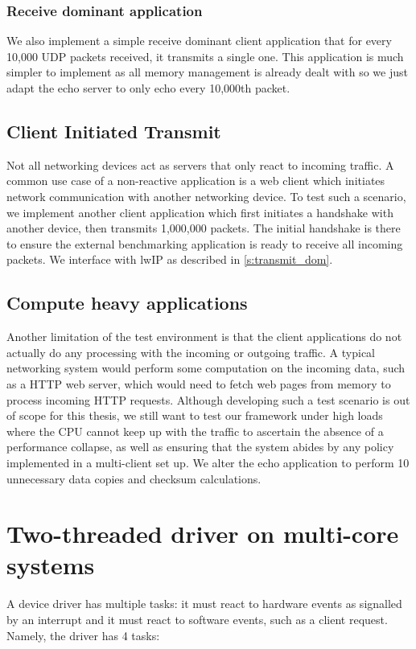 \subsubsection{Receive dominant application}
We also implement a simple receive dominant client application that for every 10,000 UDP packets received, it transmits a single one.
This application is much simpler to implement as all memory management is already dealt with so we just adapt the echo server to 
only echo every 10,000th packet.\\

\subsection{Client Initiated Transmit}
Not all networking devices act as servers that only react to incoming traffic. A common use case of a non-reactive application is a 
web client which initiates network communication with another networking device. To test such a scenario, we implement another client
application which first initiates a handshake with another device, then transmits 1,000,000 packets. The initial handshake is there to 
ensure the external benchmarking application is ready to receive all incoming packets. We interface with lwIP as described
in \autoref{s:transmit_dom}.

\subsection{Compute heavy applications}\label{s:compute_heavy}
Another limitation of the test environment is that the client applications do not actually do any processing with the incoming or outgoing traffic.
A typical networking system would perform some computation on the incoming data, such as a HTTP web server, which would need to fetch web pages from
memory to process incoming HTTP requests. Although developing such a test scenario is out of scope for this thesis, we still want to test
our framework under high loads where the CPU cannot keep up with the traffic to ascertain the absence of a performance collapse, as well as
ensuring that the system abides by any policy implemented in a multi-client set up. We alter the echo application to perform 10 unnecessary data copies
and checksum calculations.

\section{Two-threaded driver on multi-core systems}
A device driver has multiple tasks: it must react to hardware events as signalled by an interrupt and it must react to software events,
such as a client request. Namely, the driver has 4 tasks:

